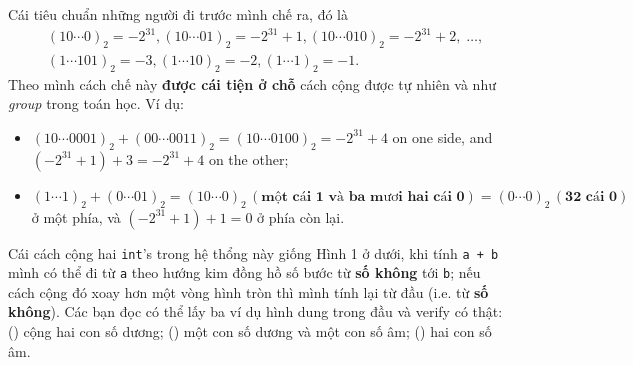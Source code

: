 \documentclass{article}
\begin{document}
Cái tiêu chuẩn những người đi trước mình chế ra, đó là
\begin{equation*}
\begin{split}
	&(10\cdots0)_{2} = -2^{31}, (10\cdots01)_{2} = -2^{31} + 1, (10\cdots010)_{2} = -2^{31} + 2, \;\ldots, \\
	&(1\cdots101)_{2} = -3, (1\cdots10)_{2} = -2, (1\cdots1)_{2} = -1.
\end{split}
\end{equation*}
Theo mình cách chế này \textbf{được cái tiện ở chỗ} cách cộng được tự nhiên và như \emph{group} trong toán học. Ví dụ:
\begin{itemize}
	\item $(10\cdots0001)_{2} + (00\cdots0011)_{2} = (10\cdots0100)_{2} = -2^{31} + 4$ on one side, and $(-2^{31} + 1) + 3 = -2^{31} + 4$ on the other;
	\item $(1\cdots1)_{2} + (0\cdots01)_{2} = (10\cdots0)_{2} \,(\textbf{một cái 1 và ba mươi hai cái 0}) = (0\cdots0)_{2} \,(\textbf{32 cái 0})$ ở một phía, và $(-2^{31} + 1) + 1 = 0$ ở phía còn lại.
\end{itemize}

Cái cách cộng hai \texttt{int}'s trong hệ thổng này giống Hình 1 ở dưới, khi tính \texttt{a + b} mình có thể đi từ \texttt{a} theo hướng kim đồng hồ số bước từ \textbf{số không} tới \texttt{b}; nếu cách cộng đó xoay hơn một vòng hình tròn thì mình tính lại từ đầu (i.e. từ \textbf{số không}). Các bạn đọc có thể lấy ba ví dụ hình dung trong đầu và verify có thật: () cộng hai con số dương; () một con số dương và một con số âm; () hai con số âm.
\end{document}
